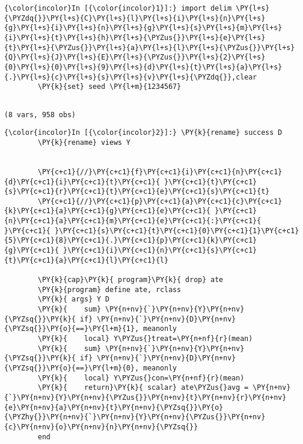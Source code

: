 \documentclass[11pt,notitlepage]{article}\usepackage[]{graphicx}\usepackage[]{color}
\makeatletter
\newenvironment{kframe}{%
 \def\at@end@of@kframe{}%
 \ifinner\ifhmode%
  \def\at@end@of@kframe{\end{minipage}}%
  \begin{minipage}{\columnwidth}%
 \fi\fi%
 \def\FrameCommand##1{\hskip\@totalleftmargin \hskip-\fboxsep
 \colorbox{shadecolor}{##1}\hskip-\fboxsep
     \hskip-\linewidth \hskip-\@totalleftmargin \hskip\columnwidth}%
 \MakeFramed {\advance\hsize-\width
   \@totalleftmargin\z@ \linewidth\hsize
   \@setminipage}}%
 {\par\unskip\endMakeFramed%
 \at@end@of@kframe}
\newenvironment{knitrout}{}{} %
\makeatother
\begin{document}
\begin{knitrout}
\color{fgcolor}\begin{kframe}
  
   \begin{Verbatim}[commandchars=\\\{\}]
{\color{incolor}In [{\color{incolor}1}]:} import delim \PY{l+s}{\PYZdq{}}\PY{l+s}{C}\PY{l+s}{l}\PY{l+s}{i}\PY{l+s}{n}\PY{l+s}{g}\PY{l+s}{i}\PY{l+s}{n}\PY{l+s}{g}\PY{l+s}{s}\PY{l+s}{m}\PY{l+s}{i}\PY{l+s}{t}\PY{l+s}{h}\PY{l+s}{\PYZus{}}\PY{l+s}{e}\PY{l+s}{t}\PY{l+s}{\PYZus{}}\PY{l+s}{a}\PY{l+s}{l}\PY{l+s}{\PYZus{}}\PY{l+s}{Q}\PY{l+s}{J}\PY{l+s}{E}\PY{l+s}{\PYZus{}}\PY{l+s}{2}\PY{l+s}{0}\PY{l+s}{0}\PY{l+s}{9}\PY{l+s}{d}\PY{l+s}{t}\PY{l+s}{a}\PY{l+s}{.}\PY{l+s}{c}\PY{l+s}{s}\PY{l+s}{v}\PY{l+s}{\PYZdq{}},clear
        \PY{k}{set} seed \PY{l+m}{1234567}
\end{Verbatim}
  \begin{Verbatim}[commandchars=\\\{\}]

(8 vars, 958 obs)

    \end{Verbatim}

    \begin{Verbatim}[commandchars=\\\{\}]
{\color{incolor}In [{\color{incolor}2}]:} \PY{k}{rename} success D
        \PY{k}{rename} views Y
        
        
        \PY{c+c1}{//}\PY{c+c1}{f}\PY{c+c1}{i}\PY{c+c1}{n}\PY{c+c1}{d}\PY{c+c1}{i}\PY{c+c1}{t}\PY{c+c1}{ }\PY{c+c1}{t}\PY{c+c1}{s}\PY{c+c1}{r}\PY{c+c1}{t}\PY{c+c1}{e}\PY{c+c1}{s}\PY{c+c1}{t}
        \PY{c+c1}{//}\PY{c+c1}{p}\PY{c+c1}{a}\PY{c+c1}{c}\PY{c+c1}{k}\PY{c+c1}{a}\PY{c+c1}{g}\PY{c+c1}{e}\PY{c+c1}{ }\PY{c+c1}{n}\PY{c+c1}{a}\PY{c+c1}{m}\PY{c+c1}{e}\PY{c+c1}{:}\PY{c+c1}{ }\PY{c+c1}{ }\PY{c+c1}{s}\PY{c+c1}{t}\PY{c+c1}{0}\PY{c+c1}{1}\PY{c+c1}{5}\PY{c+c1}{8}\PY{c+c1}{.}\PY{c+c1}{p}\PY{c+c1}{k}\PY{c+c1}{g}\PY{c+c1}{ }\PY{c+c1}{i}\PY{c+c1}{n}\PY{c+c1}{s}\PY{c+c1}{t}\PY{c+c1}{a}\PY{c+c1}{l}\PY{c+c1}{l}
        
        \PY{k}{cap}\PY{k}{ program}\PY{k}{ drop} ate
        \PY{k}{program} define ate, rclass
        \PY{k}{	args} Y D
        \PY{k}{    sum} \PY{n+nv}{`}\PY{n+nv}{Y}\PY{n+nv}{\PYZsq{}}\PY{k}{ if} \PY{n+nv}{`}\PY{n+nv}{D}\PY{n+nv}{\PYZsq{}}\PY{o}{==}\PY{l+m}{1}, meanonly
        \PY{k}{    local} Y\PYZus{}treat=\PY{n+nf}{r}(mean)
        \PY{k}{    sum} \PY{n+nv}{`}\PY{n+nv}{Y}\PY{n+nv}{\PYZsq{}}\PY{k}{ if} \PY{n+nv}{`}\PY{n+nv}{D}\PY{n+nv}{\PYZsq{}}\PY{o}{==}\PY{l+m}{0}, meanonly
        \PY{k}{    local} Y\PYZus{}con=\PY{n+nf}{r}(mean)
        \PY{k}{    return}\PY{k}{ scalar} ate\PYZus{}avg = \PY{n+nv}{`}\PY{n+nv}{Y}\PY{n+nv}{\PYZus{}}\PY{n+nv}{t}\PY{n+nv}{r}\PY{n+nv}{e}\PY{n+nv}{a}\PY{n+nv}{t}\PY{n+nv}{\PYZsq{}}\PY{o}{\PYZhy{}}\PY{n+nv}{`}\PY{n+nv}{Y}\PY{n+nv}{\PYZus{}}\PY{n+nv}{c}\PY{n+nv}{o}\PY{n+nv}{n}\PY{n+nv}{\PYZsq{}}
        end
        

\end{Verbatim}
\end{kframe}
\end{knitrout}
\end{document}
